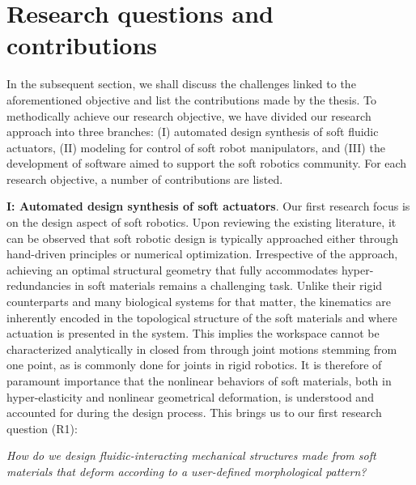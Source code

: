 \section{Research questions and contributions}
In the subsequent section, we shall discuss the challenges linked to the aforementioned objective and list the contributions made by the thesis. To methodically achieve our research objective, we have divided our research approach into three branches: (I) automated design synthesis of soft fluidic actuators, (II) modeling for control of soft robot manipulators, and (III) the development of software aimed to support the soft robotics community. For each research objective, a number of contributions are listed. \vspace{1mm}

\par \textbf{I: Automated design synthesis of soft actuators}. Our first research focus is on the design aspect of soft robotics. Upon reviewing the existing literature, it can be observed that soft robotic design is typically approached either through hand-driven principles or numerical optimization. Irrespective of the approach, achieving an optimal structural geometry that fully accommodates hyper-redundancies in soft materials remains a challenging task. Unlike their rigid counterparts and many biological systems for that matter, the kinematics are inherently encoded in the topological structure of the soft materials and where actuation is presented in the system. This implies the workspace cannot be characterized analytically in closed from through joint motions stemming from one point, as is commonly done for joints in rigid robotics.  It is therefore of paramount importance that the nonlinear behaviors of soft materials, both in hyper-elasticity and nonlinear geometrical deformation, is understood and accounted for during the design process. This brings us to our first research question (R1):
%
\begin{center}
\textit{
How do we design fluidic-interacting mechanical structures made from soft materials that deform according to a user-defined morphological pattern?
}
\end{center}
%
